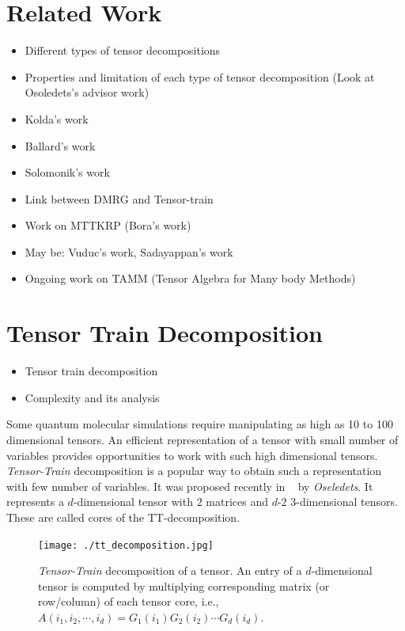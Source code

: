 \documentclass[runningheads]{llncs}
\newcommand{\ttrain}{{\it Tensor-Train}\xspace}
\begin{document}
\section{Related Work}
\label{sec:relatedWork}
\begin{itemize}
	\item Different types of tensor decompositions
	\item Properties and limitation of each type of tensor decomposition (Look at Osoledets's advisor work)
	\item Kolda's work
	\item Ballard's work
	\item Solomonik's work
	\item Link between DMRG and Tensor-train 
	\item Work on MTTKRP (Bora's work)
	\item May be: Vuduc's work, Sadayappan's work
	\item Ongoing work on TAMM (Tensor Algebra for Many body Methods)
\end{itemize}


\section{Tensor Train Decomposition}
\label{sec:tt}
\begin{itemize}
	\item Tensor train decomposition
	\item Complexity and its analysis
\end{itemize}

\noindent Some quantum molecular simulations require manipulating as high as 10 to 100 dimensional tensors. An efficient representation of a tensor with small number of variables provides opportunities to work with such high dimensional tensors. \ttrain decomposition is a popular way to obtain such a representation with few number of variables. It was proposed recently in ~\cite{tt} by \textit{Oseledets}. It represents a $d$-dimensional tensor with $2$ matrices and $d$-$2$ $3$-dimensional tensors. These are called cores of the TT-decomposition.

\begin{figure}
	\begin{center}

	\texttt{[image: ./tt\_decomposition.jpg]}
	\caption{\ttrain decomposition of a tensor. An entry of a $d$-dimensional tensor is computed by multiplying corresponding matrix (or row/column) of each tensor core, i.e., $A(i_1, i_2,\cdots, i_d) = G_1(i_1)G_2(i_2)\cdots G_d(i_d)$.\label{fig:ttdiagram}}
	\end{center}
\end{figure}
\end{document}
